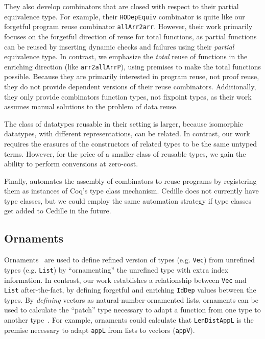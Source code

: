 \documentclass[acmsmall]{acmart}\settopmatter{}
\begin{document}
They also develop combinators that are closed with respect to their
partial equivalence type. For example, their \verb;HODepEquiv; combinator is
quite like our forgetful program reuse combinator
\verb;allArr2arr;. However, their work primarily focuses on the
forgetful direction of reuse for total functions, as partial functions
can be reused by inserting dynamic checks and failures using their
\textit{partial} equivalence type. In contrast, we emphasize the
\textit{total} reuse of functions in the enriching direction (like
\verb;arr2allArrP;), using premises to make the total functions
possible. Because they are primarily interested in program reuse, not
proof reuse, they do not provide dependent versions of their reuse
combinators. Additionally, they only provide combinators function
types, not fixpoint types, as their work assumes manual solutions to
the problem of data reuse.

The class of datatypes reusable in their setting is larger, because
isomorphic datatypes, with different representations, can be
related. In contrast, our work requires the erasures of the
constructors of related types to be the same untyped terms. However,
for the price of a smaller class of reusable types, we gain the
ability to perform conversions at zero-cost.

Finally, \citet{dagand:interop} automates the assembly of combinators
to reuse programs by registering them as instances of Coq's type
class mechanism. Cedille does not currently have type classes, but we could
employ the same automation strategy if type classes get added to
Cedille in the future.

\subsection{Ornaments}

Ornaments~\cite{ornaments:original} are used to define refined
version of types (e.g. \texttt{Vec}) from unrefined types
(e.g. \texttt{List}) by ``ornamenting'' the unrefined type with extra
index information. In contrast, our work establishes a relationship
between \texttt{Vec} and \texttt{List} after-the-fact, by defining
forgetful and enriching \verb;IdDep; values between the types.
By \textit{defining} vectors as natural-number-ornamented lists,
ornaments can be used to calculate the ``patch'' type necessary to adapt a
function from one type to another type~\cite{ornaments:functional}.
For example, ornaments could
calculate that \texttt{LenDistAppL} is the premise necessary to adapt
\texttt{appL} from lists to vectors (\texttt{appV}).
\end{document}
